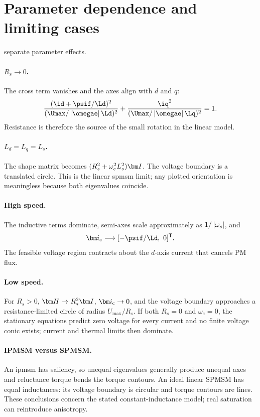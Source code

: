 \section{Parameter dependence and limiting cases}

 separate parameter effects.

\paragraph{$R_s\to0$.}
The cross term vanishes and the axes align with $d$ and $q$:
\begin{equation}
 \frac{(\id+\psif/\Ld)^2}{(\Umax/\abs{\omegae}\Ld)^2}
 +\frac{\iq^2}{(\Umax/\abs{\omegae}\Lq)^2}=1.
\end{equation}
Resistance is therefore the source of the small rotation in the linear model.

\paragraph{$L_d=L_q=L_s$.}
The shape matrix becomes
$(R_s^2+\omega_e^2L_s^2)\matr I$.  The voltage boundary is a translated
circle.  This is the linear \gls{spmsm} limit; any plotted orientation is
meaningless because both eigenvalues coincide.

\paragraph{High speed.}
The inductive terms dominate, semi-axes scale approximately as
$1/\left\lvert\omega_e\right\rvert$, and
\begin{equation}
 \ic\longrightarrow[-\psif/\Ld,\ 0]\trans.
\end{equation}
The feasible voltage region contracts about the $d$-axis current that cancels
PM flux.

\paragraph{Low speed.}
For $R_s>0$, $\Hpsm\to R_s^2\matr I$, $\ic\to0$, and the voltage boundary
approaches a resistance-limited circle of radius $U_{\max}/R_s$.  If both
$R_s=0$ and $\omega_e=0$, the stationary equations predict zero voltage for
every current and no finite voltage conic exists; current and thermal limits
then dominate.

\paragraph{IPMSM versus SPMSM.}
An \gls{ipmsm} has saliency, so unequal eigenvalues generally produce unequal
axes and reluctance torque bends the torque contours.  An ideal linear SPMSM
has equal inductances: its voltage boundary is circular and torque contours are
lines.  These conclusions concern the stated constant-inductance model; real
saturation can reintroduce anisotropy.

